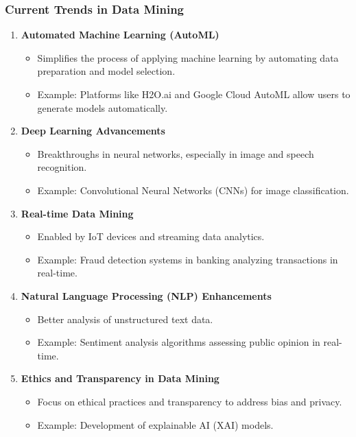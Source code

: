 \documentclass{beamer}
\begin{document}
\begin{frame}[fragile]
    \frametitle{Current Trends in Data Mining}
    
    \begin{enumerate}
        \item \textbf{Automated Machine Learning (AutoML)}
        \begin{itemize}
            \item Simplifies the process of applying machine learning by automating data preparation and model selection.
            \item Example: Platforms like H2O.ai and Google Cloud AutoML allow users to generate models automatically.
        \end{itemize}
        
        \item \textbf{Deep Learning Advancements}
        \begin{itemize}
            \item Breakthroughs in neural networks, especially in image and speech recognition.
            \item Example: Convolutional Neural Networks (CNNs) for image classification.
        \end{itemize}
        
        \item \textbf{Real-time Data Mining}
        \begin{itemize}
            \item Enabled by IoT devices and streaming data analytics.
            \item Example: Fraud detection systems in banking analyzing transactions in real-time.
        \end{itemize}
        
        \item \textbf{Natural Language Processing (NLP) Enhancements}
        \begin{itemize}
            \item Better analysis of unstructured text data.
            \item Example: Sentiment analysis algorithms assessing public opinion in real-time.
        \end{itemize}
        
        \item \textbf{Ethics and Transparency in Data Mining}
        \begin{itemize}
            \item Focus on ethical practices and transparency to address bias and privacy.
            \item Example: Development of explainable AI (XAI) models.
        \end{itemize}
    \end{enumerate}
\end{frame}
\end{document}
